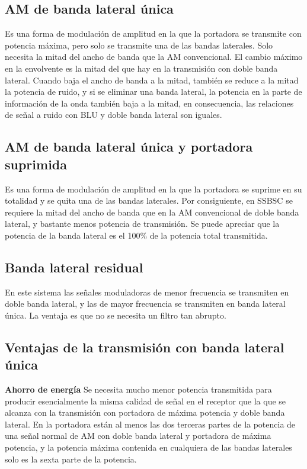 \documentclass[10pt,a4paper]{article}
\begin{document}
\subsection{AM de banda lateral única}
Es una forma de modulación de amplitud en la que la portadora se transmite con potencia máxima, pero solo se transmite una de las bandas laterales. Solo necesita la mitad del ancho de banda que la AM convencional. El cambio máximo en la envolvente es la mitad del que hay en la transmisión con doble banda lateral. Cuando baja el ancho de banda a la mitad, también se reduce a la mitad la potencia de ruido, y si se eliminar una banda lateral, la potencia en la parte de información de la onda también baja a la mitad, en consecuencia, las relaciones de señal a ruido con BLU y doble banda lateral son iguales.

\subsection{AM de banda lateral única y portadora suprimida}
Es una forma de modulación de amplitud en la que la portadora se suprime en su totalidad y se quita una de las bandas laterales. Por consiguiente, en SSBSC se requiere la mitad del ancho de banda que en la AM convencional de doble banda lateral, y bastante menos potencia de transmisión. Se puede apreciar que la potencia de la banda lateral es el 100\% de la potencia total transmitida.

\subsection{Banda lateral residual}
En este sistema las señales moduladoras de menor frecuencia se transmiten en doble banda lateral, y las de mayor frecuencia se transmiten en banda lateral única. La ventaja es que no se necesita un filtro tan abrupto.

\subsection{Ventajas de la transmisión con banda lateral única}
\textbf{Ahorro de energía} Se necesita mucho menor potencia transmitida para producir esencialmente la misma calidad de señal en el receptor que la que se alcanza con la transmisión con portadora de máxima potencia y doble banda lateral. En la portadora están al menos las dos terceras partes de la potencia de una señal normal de AM con doble banda lateral y portadora de máxima potencia, y la potencia máxima contenida en cualquiera de las bandas laterales solo es la sexta parte de la potencia.\\
\end{document}
